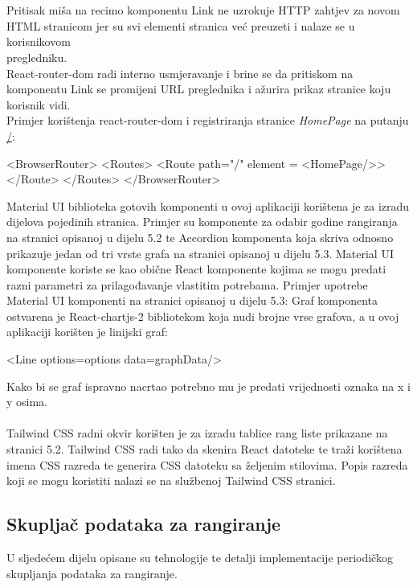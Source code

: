 \documentclass[times, utf8, zavrsni]{fer}
\begin{document}
\\\\Pritisak miša na recimo komponentu Link ne uzrokuje HTTP zahtjev za novom HTML stranicom jer su svi elementi stranica već preuzeti i nalaze se u korisnikovom \\pregledniku.
\\React-router-dom radi interno usmjeravanje i brine se da pritiskom na komponentu Link se promijeni URL preglednika i ažurira prikaz stranice koju korisnik vidi.
\\Primjer korištenja react-router-dom i registriranja stranice \emph{HomePage} na putanju \url{/}:
\begin{verbnobox}[\fontsize{10pt}{10pt}\selectfont]
<BrowserRouter>
    <Routes>
        <Route path="/" element = {<HomePage/>}></Route>
    </Routes>
</BrowserRouter>
\end{verbnobox}
Material UI biblioteka gotovih komponenti u ovoj aplikaciji korištena je za izradu dijelova pojedinih stranica. Primjer su komponente za odabir godine rangiranja
na stranici opisanoj u dijelu 5.2 te Accordion komponenta koja skriva odnosno prikazuje jedan od tri vrste grafa na stranici opisanoj u dijelu 5.3.
Material UI komponente koriste se kao obične React komponente kojima se mogu predati razni parametri za prilagođavanje vlastitim potrebama.
Primjer upotrebe Material UI komponenti na stranici opisanoj u dijelu 5.3:
Graf komponenta ostvarena je React-chartjs-2 bibliotekom koja nudi brojne vrse grafova, a u ovoj aplikaciji korišten je linijski graf:
\begin{verbnobox}[\fontsize{10pt}{10pt}\selectfont]
<Line options={options} data={graphData}/>
\end{verbnobox}
Kako bi se graf ispravno nacrtao potrebno mu je predati vrijednosti oznaka na x i y osima.
\\\\Tailwind CSS radni okvir korišten je za izradu tablice rang liste prikazane na stranici 5.2. Tailwind CSS radi tako da skenira React datoteke 
te traži korištena imena CSS razreda te generira CSS datoteku sa željenim stilovima. Popis razreda koji se mogu koristiti nalazi se na službenoj
Tailwind CSS stranici.
\\ \subsection{Skupljač podataka za rangiranje}
U sljedećem dijelu opisane su tehnologije te detalji implementacije periodičkog \\skupljanja podataka za rangiranje.
\end{document}
